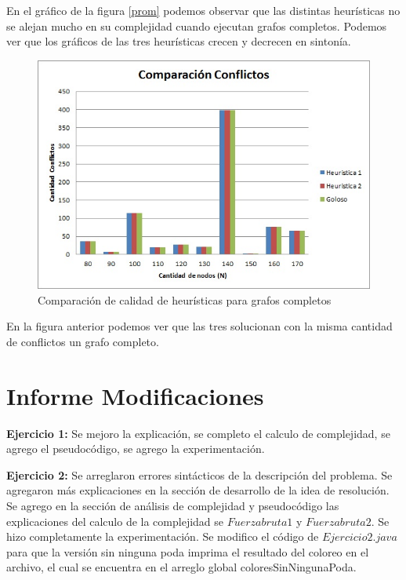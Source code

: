 \documentclass[a4paper]{article}
\begin{document}
En el gráfico de la figura \ref{prom} podemos observar que las distintas heurísticas no se alejan mucho en su complejidad cuando ejecutan grafos completos. Podemos ver que los gráficos de las tres heurísticas crecen y decrecen en sintonía.

\begin{figure}[H]
  \begin{center}
      \includegraphics[scale=0.75]{../Ejercicio5Conflictos.jpg}
  \end{center}
  \caption{Comparación de calidad de heurísticas para grafos completos}
\end{figure}


En la figura anterior podemos ver que las tres solucionan con la misma cantidad de conflictos un grafo completo.
\newpage
\section{Informe Modificaciones}

\textbf{Ejercicio 1:} Se mejoro la explicación, se completo el calculo de complejidad, se agrego el pseudocódigo, se agrego la experimentación.

\textbf{Ejercicio 2:} Se arreglaron errores sintácticos de la descripción del problema. \newline
Se agregaron más explicaciones en la sección de desarrollo de la idea de resolución. \newline
Se agrego en la sección de análisis de complejidad y pseudocódigo las explicaciones del calculo de la complejidad se $Fuerza bruta 1$ y $ Fuerza bruta 2$. \newline
Se hizo completamente la experimentación. Se modifico el código de $ Ejercicio2.java $ para que la versión sin ninguna poda imprima el resultado del coloreo en el archivo, el cual se encuentra en el arreglo global coloresSinNingunaPoda.
\end{document}
